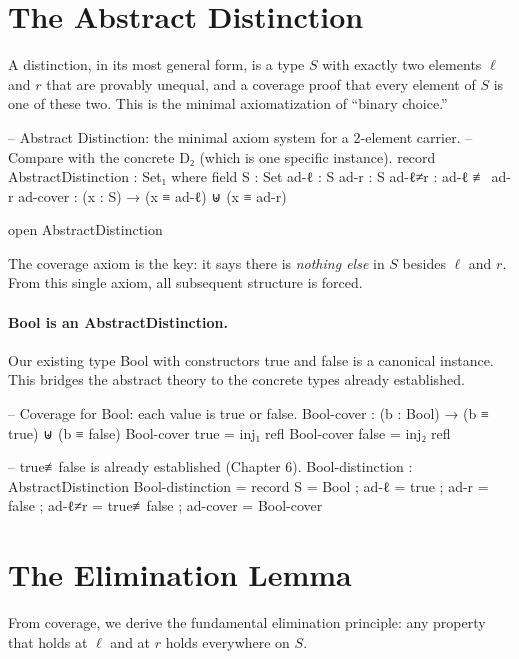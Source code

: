 \documentclass[11pt,a4paper]{book}
\def\texttt#1{#1}%
\begin{document}
\section{The Abstract Distinction}

A distinction, in its most general form, is a type $S$ with exactly two elements
$\ell$ and $r$ that are provably unequal, and a coverage proof that every element
of $S$ is one of these two. This is the minimal axiomatization of ``binary choice.''

\begin{code}
-- Abstract Distinction: the minimal axiom system for a 2-element carrier.
-- Compare with the concrete D₂ (which is one specific instance).
record AbstractDistinction : Set₁ where
  field
    S     : Set
    ad-ℓ  : S
    ad-r  : S
    ad-ℓ≠r : ad-ℓ ≢ ad-r
    ad-cover : (x : S) → (x ≡ ad-ℓ) ⊎ (x ≡ ad-r)

open AbstractDistinction
\end{code}

The coverage axiom is the key: it says there is \emph{nothing else} in $S$ besides
$\ell$ and $r$. From this single axiom, all subsequent structure is forced.

\paragraph{Bool is an AbstractDistinction.}
Our existing type \texttt{Bool} with constructors \texttt{true} and \texttt{false}
is a canonical instance. This bridges the abstract theory to the concrete types
already established.

\begin{code}
-- Coverage for Bool: each value is true or false.
Bool-cover : (b : Bool) → (b ≡ true) ⊎ (b ≡ false)
Bool-cover true  = inj₁ refl
Bool-cover false = inj₂ refl

-- true≢false is already established (Chapter 6).
Bool-distinction : AbstractDistinction
Bool-distinction = record
  { S      = Bool
  ; ad-ℓ   = true
  ; ad-r   = false
  ; ad-ℓ≠r = true≢false
  ; ad-cover = Bool-cover
  }
\end{code}

\section{The Elimination Lemma}

From coverage, we derive the fundamental elimination principle: any property that
holds at $\ell$ and at $r$ holds everywhere on $S$.
\end{document}
